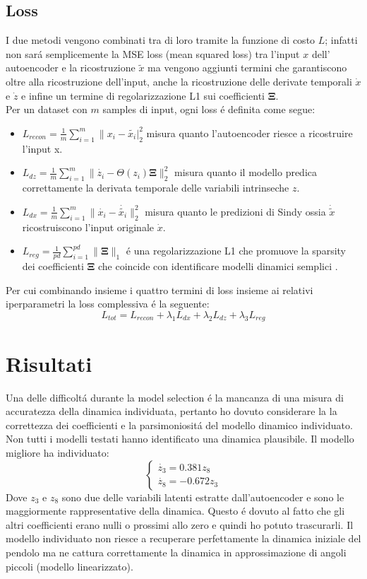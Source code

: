 \documentclass[11pt]{article}
\begin{document}
\subsection{Loss}
I due metodi vengono combinati tra di loro tramite la funzione di costo $L$; infatti non sará semplicemente la MSE loss (mean squared loss) tra l'input $x$ dell' autoencoder e la ricostruzione $\tilde{x}$ ma vengono aggiunti termini che garantiscono oltre alla ricostruzione dell'input, anche la ricostruzione delle derivate temporali $\dot{x}$ e $\dot{z}$ e infine un termine di regolarizzazione L1 sui coefficienti $\mathbf{\Xi} $. \\ 
Per un dataset con $m$ samples di input, ogni loss é definita come segue:

\begin{itemize}
\item $L_{recon} = \frac{1}{m}\sum_{i=1}^{m}\|x_i - \tilde{x_i}|_2^2 $  misura quanto l'autoencoder riesce a ricostruire l'input x.
\item $L_{dz} = \frac{1}{m}\sum_{i=1}^{m}\|\dot{z_i} - \Theta(z_i)\mathbf{\Xi}\|_2^2 $ misura quanto il modello predica correttamente la derivata temporale delle variabili intrinseche $z$.
\item $L_{dx} = \frac{1}{m}\sum_{i=1}^{m}\|\dot{x_i} - \dot{\tilde{x_i}}\|_2^2 $ misura quanto le predizioni di Sindy ossia $\dot{\tilde{x}}$ ricostruiscono l'input originale $\dot{x}$.
\item $L_{reg} = \frac{1}{pd}\sum_{i=1}^{pd}\|{\mathbf{\Xi}}\|_1 $ é una regolarizzazione L1 che promuove la sparsity dei coefficienti $\mathbf{\Xi}$ che coincide con identificare modelli dinamici semplici .
\end{itemize}
Per cui combinando insieme i quattro termini di loss insieme ai relativi iperparametri la loss complessiva é la seguente: 
$$L_{tot} = L_{recon} + \lambda_1L_{dx} + \lambda_2L_{dz} + \lambda_3L_{reg} $$



\section{Risultati}
Una delle difficoltá durante la model selection é la mancanza di una misura di accuratezza della dinamica individuata, pertanto ho dovuto considerare la la correttezza dei coefficienti e la parsimoniositá del modello dinamico individuato. Non tutti i modelli testati hanno identificato una dinamica plausibile. Il modello migliore ha individuato:
$$
\begin{cases} 
\dot{z_3} = 0.381 z_8 \\ 
\dot{z_8} = - 0.672 z_3
\end{cases}
$$
Dove $z_3$ e $z_8$ sono due delle variabili latenti estratte dall'autoencoder e sono le maggiormente rappresentative della dinamica.
Questo é dovuto al fatto che gli altri coefficienti erano nulli o prossimi allo zero e quindi ho potuto trascurarli. Il modello individuato non riesce a recuperare perfettamente la dinamica iniziale del pendolo ma ne cattura correttamente la dinamica in approssimazione di angoli piccoli (modello linearizzato).
\end{document}
